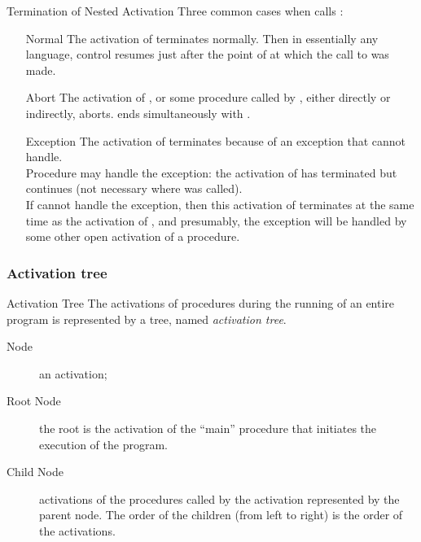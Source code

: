 \begin{bibunit}[apalike]
\begin{frame}[allowframebreaks]{Termination of Nested Activation}
	Three common cases when  calls :
	\vspace{1em}
	\begin{enumerate}
	\item[Normal] The activation of  terminates normally. Then in essentially any language, control resumes just after the point of  at which the call to  was made.
	\vspace{1em}
	\item[Abort] The activation of , or some procedure called by , either directly or indirectly, aborts.
 ends simultaneously with .
	\item[Exception] The activation of  terminates because of an exception that  cannot handle. \\
		Procedure  may handle the exception: the activation of  has terminated but  continues (not necessary where  was called). \\
		If  cannot handle the exception, then this activation of  terminates at the same time as the activation of , and presumably, the exception will be handled by some other open activation of a procedure.
	\end{enumerate}
\end{frame}

\subsubsection{Activation tree}

\tableofcontentslide[sections={1-4},sectionstyle={show/shaded},subsectionstyle={show/shaded/hide},subsubsectionstyle={show/shaded/hide/hide}]

\begin{frame}{Activation Tree}
	The activations of procedures during the running of an entire program is represented by a tree, named \emph{activation tree}.
	\vfill
	\begin{description}
	\item[Node] an activation;
	\vfill
	\item[Root Node] the root is the activation of the ``main'' procedure that initiates the execution of the program.
	\vfill
	\item[Child Node] activations of the procedures called by the activation represented by the parent node. The order of the children (from left to right) is the order of the activations.
	\end{description}
\end{frame}


\end{bibunit}
